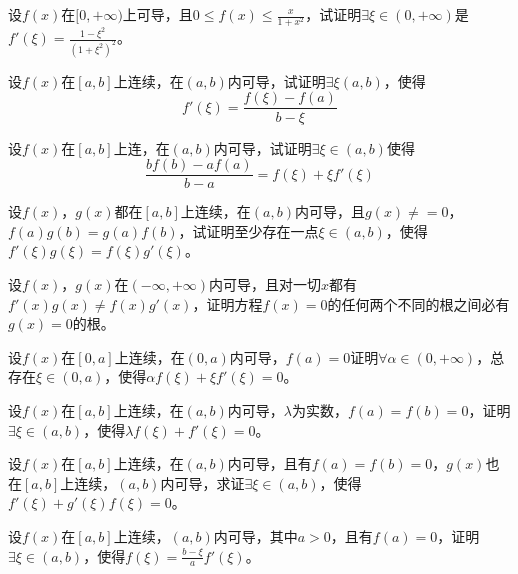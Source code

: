 \begin{example}
	设$f(x)$在$[0,+\infty)$上可导，且$0\leqslant f(x)\leqslant\frac{x}{1+x^2}$，试证明$\exists\xi\in(0,+\infty)$是$f'(\xi)=\frac{1-\xi^2}{(1+\xi^2)^2}$。
\end{example}

\begin{example}
	设$f(x)$在$[a,b]$上连续，在$(a,b)$内可导，试证明$\exists\xi(a,b)$，使得\[f'(\xi)=\frac{f(\xi)-f(a)}{b-\xi}\]
\end{example}

\begin{example}
	设$f(x)$在$[a,b]$上连，在$(a,b)$内可导，试证明$\exists\xi\in(a,b)$使得\[\frac{bf(b)-af(a)}{b-a}=f(\xi)+\xi f'(\xi)\]
\end{example}

\begin{example}
	设$f(x)$，$g(x)$都在$[a,b]$上连续，在$(a,b)$内可导，且$g(x)\neq=0$，$f(a)g(b)=g(a)f(b)$，试证明至少存在一点$\xi\in(a,b)$，使得$f'(\xi)g(\xi)=f(\xi)g'(\xi)$。
\end{example}

\begin{example}
	设$f(x)$，$g(x)$在$(-\infty,+\infty)$内可导，且对一切$x$都有$f'(x)g(x)\neq f(x)g'(x)$，证明方程$f(x)=0$的任何两个不同的根之间必有$g(x)=0$的根。
\end{example}

\begin{example}
	设$f(x)$在$[0,a]$上连续，在$(0,a)$内可导，$f(a)=0$证明$\forall\alpha\in(0,+\infty)$，总存在$\xi\in(0,a)$，使得$\alpha f(\xi)+\xi f'(\xi)=0$。
\end{example}

\begin{example}
	设$f(x)$在$[a,b]$上连续，在$(a,b)$内可导，$\lambda$为实数，$f(a)=f(b)=0$，证明$\exists\xi\in(a,b)$，使得$\lambda f(\xi)+f'(\xi)=0$。
\end{example}

\begin{example}
	设$f(x)$在$[a,b]$上连续，在$(a,b)$内可导，且有$f(a)=f(b)=0$，$g(x)$也在$[a,b]$上连续，$(a,b)$内可导，求证$\exists\xi\in(a,b)$，使得$f'(\xi)+g'(\xi)f(\xi)=0$。
\end{example}

\begin{example}
	设$f(x)$在$[a,b]$上连续，$(a,b)$内可导，其中$a>0$，且有$f(a)=0$，证明$\exists\xi\in(a,b)$，使得$f(\xi)=\frac{b-\xi}{a}f'(\xi)$。
\end{example}

